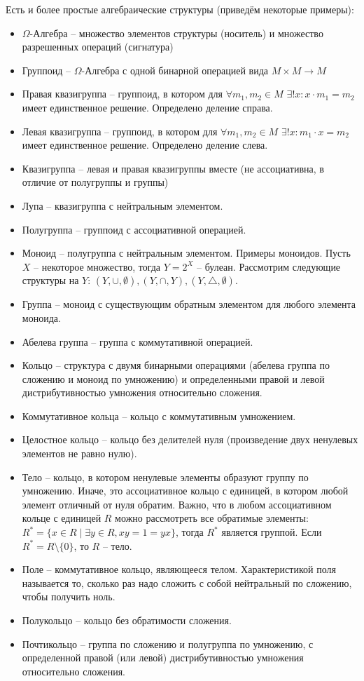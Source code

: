 \documentclass[a4paper]{book}
\begin{document}
Есть и более простые алгебраические структуры (приведём некоторые примеры): 
\begin{itemize}
	\item $\Omega$-Алгебра -- множество элементов структуры (носитель) и множество разрешенных операций (сигнатура)
	\item Группоид -- $\Omega$-Алгебра с одной бинарной операцией вида $M\times M\rightarrow M$
	\item Правая квазигруппа -- группоид, в котором для $\forall m_1, m_2\in M$ $\exists! x: x\cdot m_1 = m_2$ имеет единственное решение. Определено деление справа. 
	\item Левая квазигруппа -- группоид, в котором для $\forall m_1, m_2\in M$ $\exists! x: m_1\cdot x = m_2$ имеет единственное решение. Определено деление слева. 
	\item Квазигруппа -- левая и правая квазигруппы вместе (не ассоциативна, в отличие от полугруппы и группы)
	\item Лупа -- квазигруппа с нейтральным элементом. 
	\item Полугруппа -- группоид с ассоциативной операцией. 
	\item Моноид -- полугруппа с нейтральным элементом. Примеры моноидов. Пусть $X$ -- некоторое множество, тогда $Y = 2^X$ -- булеан. Рассмотрим следующие структуры на $Y$: $(Y,\cup,\emptyset), (Y,\cap,Y), (Y,\triangle,\emptyset)$. 
	\item Группа -- моноид с существующим обратным элементом для любого элемента моноида. 
	\item Абелева группа -- группа с коммутативной операцией. 
	\item Кольцо -- структура с двумя бинарными операциями (абелева группа по сложению и моноид по умножению) и определенными правой и левой дистрибутивностью умножения относительно сложения. 
	\item Коммутативное кольца -- кольцо с коммутативным умножением. 
	\item Целостное кольцо -- кольцо без делителей нуля (произведение двух ненулевых элементов не равно нулю).
	\item Тело -- кольцо, в котором ненулевые элементы образуют группу по умножению. Иначе, это ассоциативное кольцо с единицей, в котором любой элемент отличный от нуля обратим. Важно, что в любом ассоциативном кольце с единицей $R$ можно рассмотреть все обратимые элементы: $R^{\ast}=\{x\in R \mid \exists y\in R, xy = 1 = yx\}$, тогда $R^{\ast}$ является группой. Если $R^{\ast} = R\setminus\{0\}$, то $R$ -- тело. 
	\item Поле -- коммутативное кольцо, являющееся телом. Характеристикой поля называется то, сколько раз надо сложить с собой нейтральный по сложению, чтобы получить ноль. 
	\item Полукольцо -- кольцо без обратимости сложения. 
	\item Почтикольцо -- группа по сложению и полугруппа по умножению, с определенной правой (или левой) дистрибутивностью умножения относительно сложения. 
	
\end{itemize}
\end{document}
